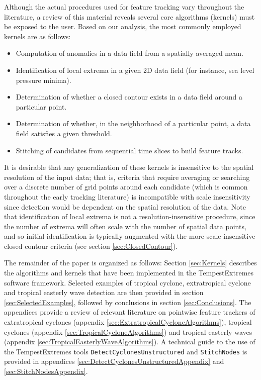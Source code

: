 \documentclass[gmdd, hvmath, online]{copernicus_discussions}
\begin{document}
Although the actual procedures used for feature tracking vary throughout the literature, a review of this material reveals several core algorithms (kernels) must be exposed to the user.  Based on our analysis, the most commonly employed kernels are as follows:
\begin{itemize}
\item Computation of anomalies in a data field from a spatially averaged mean.
\item Identification of local extrema in a given 2D data field (for instance, sea level pressure minima).
\item Determination of whether a closed contour exists in a data field around a particular point.
\item Determination of whether, in the neighborhood of a particular point, a data field satisfies a given threshold.
\item Stitching of candidates from sequential time slices to build feature tracks.
\end{itemize}  It is desirable that any generalization of these kernels is insensitive to the spatial resolution of the input data; that is, criteria that require averaging or searching over a discrete number of grid points around each candidate (which is common throughout the early tracking literature) is incompatible with scale insensitivity since detection would be dependent on the spatial resolution of the data. Note that identification of local extrema is not a resolution-insensitive procedure, since the number of extrema will often scale with the number of spatial data points, and so initial identification is typically augmented with the more scale-insensitive closed contour criteria (see section \ref{sec:ClosedContour}).

The remainder of the paper is organized as follows:  Section \ref{sec:Kernels} describes the algorithms and kernels that have been implemented in the TempestExtremes software framework.  Selected examples of tropical cyclone, extratropical cyclone and tropical easterly wave detection are then provided in section \ref{sec:SelectedExamples}, followed by conclusions in section \ref{sec:Conclusions}.  The appendices provide a review of relevant literature on pointwise feature trackers of extratropical cyclones (appendix \ref{sec:ExtratropicalCycloneAlgorithms}), tropical cyclones (appendix \ref{sec:TropicalCycloneAlgorithms}) and tropical easterly waves (appendix \ref{sec:TropicalEasterlyWaveAlgorithms}).  A technical guide to the use of the TempestExtremes tools \texttt{DetectCyclonesUnstructured} and \texttt{StitchNodes} is provided in appendices \ref{sec:DetectCyclonesUnstructuredAppendix} and \ref{sec:StitchNodesAppendix}.
\end{document}
